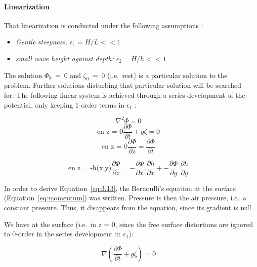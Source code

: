 \paragraph{Linearization}

That linearization is conducted under the following assumptions :

\begin{itemize}
  \item  \textit{Gentle steepness: $\epsilon_{1}=H/L << 1$}
  \item \textit{small wave height against depth: $\epsilon_{2}=H/h << 1$ }
\end{itemize}

The solution $\Phi_{0}$~=~0 and $\zeta_{0}$~=~0 (i.e.\ rest) is a
particular solution to the problem. Further solutions disturbing that
particular solution will be searched for. The following linear system is
achieved through a series development of the potential, only keeping 1-order
terms in $\epsilon_{1}$ :

\begin{equation}
  \nabla^{2}\Phi = 0
  \label{eq:3.12}
\end{equation}
\begin{equation}
  \text{en z = 0} \frac{\partial \Phi}{\partial t} + g\zeta = 0
  \label{eq:3.13}
\end{equation}
\begin{equation}
  \text{en z = 0} \frac{\partial \Phi}{\partial z} = \frac{\partial \Phi}{\partial t}
  \label{eq:3.14}
\end{equation}

\begin{equation}
  \text{en z = -h(x,y)} \frac{\partial \Phi}{\partial z} =
    - \frac{\partial\Phi}{\partial x}.\frac{\partial h}{\partial x} +
    - \frac{\partial\Phi}{\partial y}.\frac{\partial h}{\partial y}
  \label{eq:3.15}
\end{equation}

In order to derive Equation~\ref{eq:3.13}, the Bernoulli's equation at
the surface (Equation~\ref{eq:momentum}) was written. Pressure is then the
air pressure, i.e.\ a constant pressure. Thus, it disappears from the equation,
since its gradient is null

We have at the surface (i.e.\ in z = 0, since the free surface distortions are
ignored to 0-order in the series development in $\epsilon_{1}$):

\[ \nabla(\frac{\partial \Phi}{\partial t}+g\zeta) = 0\]

